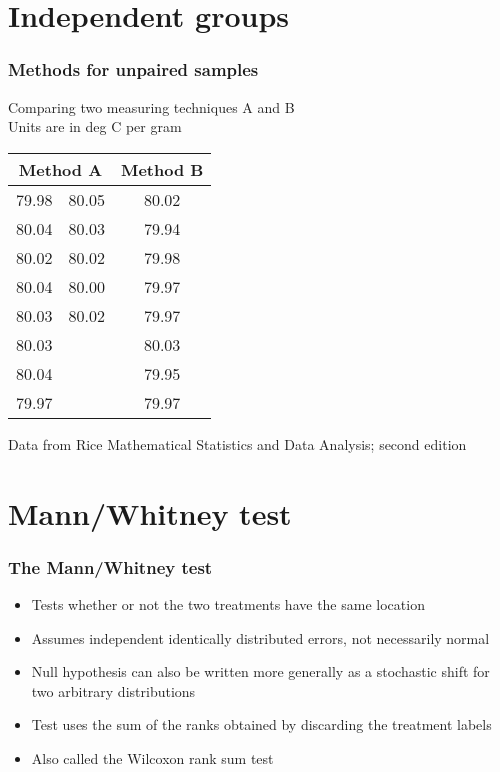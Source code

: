 \documentclass[aspectratio=169]{beamer}
\begin{document}
\section{Independent groups}
\begin{frame}\frametitle{Methods for unpaired samples} 
Comparing two measuring techniques A and B\\
Units are in deg C per gram
\begin{center}
\ttfamily
  \begin{tabular}{|cc|c|} \hline
\multicolumn{2}{|c|}{Method A} & Method B \\ \hline
79.98 & 80.05 & 80.02 \\
80.04 & 80.03 & 79.94 \\
80.02 & 80.02 & 79.98 \\
80.04 & 80.00 & 79.97 \\
80.03 & 80.02 & 79.97 \\
80.03 &       & 80.03 \\
80.04 &       & 79.95 \\
79.97 &       & 79.97 \\ \hline
  \end{tabular}
\end{center}
Data from Rice Mathematical Statistics and Data Analysis; second edition \normalsize \normalfont
\end{frame}

\section{Mann/Whitney test}
\begin{frame}\frametitle{The Mann/Whitney test}
\begin{itemize}
\item Tests whether or not the two treatments have the same location
\item Assumes independent identically distributed errors, not necessarily normal
\item Null hypothesis can also be written more generally as a stochastic shift for
  two arbitrary distributions
\item Test uses the sum of the ranks obtained by discarding the
  treatment labels
\item Also called the Wilcoxon rank sum test
\end{itemize}
\end{frame}
\end{document}
